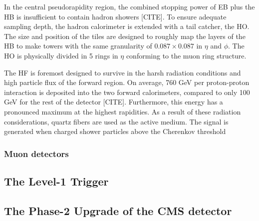 \documentclass{article}
\begin{document}
In the central pseudorapidity region, the combined stopping power of EB plus the HB is insufficient to contain hadron showers [CITE]. To ensure adequate sampling depth, the hadron calorimeter is extended with a tail catcher, the HO. The size and position of the tiles are designed to roughly map the layers of the HB to make towers with the same granularity of $0.087 \times 0.087$ in $\eta$ and $\phi$. The HO is physically divided in 5 rings in $\eta$ conforming to the muon ring structure. 

The HF is foremost designed to survive in the harsh radiation conditions and high particle flux of the forward region. On average, 760 GeV per proton-proton interaction is deposited into the two forward calorimeters, compared to only 100 GeV for the rest of the detector [CITE]. Furthermore, this energy has a pronounced maximum at the highest rapidities. As a result of these radiation considerations, quartz fibers are used as the active medium. The signal is generated when charged shower particles above the Cherenkov threshold 

\subsubsection{Muon detectors}


\subsection{The Level-1 Trigger}
\label{section:phase-1-l1-trigger}

\subsection{The Phase-2 Upgrade of the CMS detector}
\end{document}
